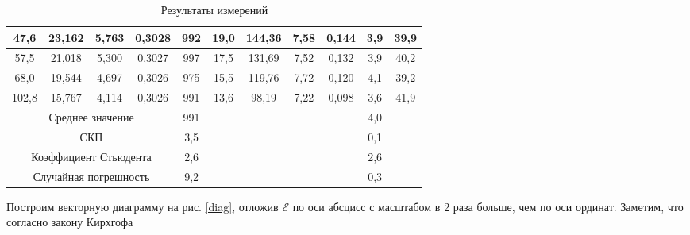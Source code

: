 \documentclass[a4paper, 12pt]{article}
\begin{document}
\begin{table}[H]
\begin{tabular}{|ccccccccccc|}
        \multicolumn{1}{|c|}{47,6} & \multicolumn{1}{c|}{23,162} & \multicolumn{1}{c|}{5,763} & \multicolumn{1}{c|}{0,3028} & \multicolumn{1}{c|}{992} & \multicolumn{1}{c|}{19,0} & \multicolumn{1}{c|}{144,36} & \multicolumn{1}{c|}{7,58} & \multicolumn{1}{c|}{0,144} & \multicolumn{1}{c|}{3,9} & 39,9 \\ \hline
        \multicolumn{1}{|c|}{57,5} & \multicolumn{1}{c|}{21,018} & \multicolumn{1}{c|}{5,300} & \multicolumn{1}{c|}{0,3027} & \multicolumn{1}{c|}{997} & \multicolumn{1}{c|}{17,5} & \multicolumn{1}{c|}{131,69} & \multicolumn{1}{c|}{7,52} & \multicolumn{1}{c|}{0,132} & \multicolumn{1}{c|}{3,9} & 40,2 \\ \hline
        \multicolumn{1}{|c|}{68,0} & \multicolumn{1}{c|}{19,544} & \multicolumn{1}{c|}{4,697} & \multicolumn{1}{c|}{0,3026} & \multicolumn{1}{c|}{975} & \multicolumn{1}{c|}{15,5} & \multicolumn{1}{c|}{119,76} & \multicolumn{1}{c|}{7,72} & \multicolumn{1}{c|}{0,120} & \multicolumn{1}{c|}{4,1} & 39,2 \\ \hline
        \multicolumn{1}{|c|}{102,8} & \multicolumn{1}{c|}{15,767} & \multicolumn{1}{c|}{4,114} & \multicolumn{1}{c|}{0,3026} & \multicolumn{1}{c|}{991} & \multicolumn{1}{c|}{13,6} & \multicolumn{1}{c|}{98,19} & \multicolumn{1}{c|}{7,22} & \multicolumn{1}{c|}{0,098} & \multicolumn{1}{c|}{3,6} & 41,9 \\ \hline
        \multicolumn{4}{|c|}{Среднее значение} & \multicolumn{1}{c|}{991} & \multicolumn{4}{c|}{\multirow{4}{*}{}} & \multicolumn{1}{c|}{4,0} & \multirow{4}{*}{} \\ \cline{1-5} \cline{10-10}
        \multicolumn{4}{|c|}{СКП} & \multicolumn{1}{c|}{3,5} & \multicolumn{4}{c|}{} & \multicolumn{1}{c|}{0,1} &  \\ \cline{1-5} \cline{10-10}
        \multicolumn{4}{|c|}{Коэффициент Стьюдента} & \multicolumn{1}{c|}{2,6} & \multicolumn{4}{c|}{} & \multicolumn{1}{c|}{2,6} &  \\ \cline{1-5} \cline{10-10}
        \multicolumn{4}{|c|}{Случайная погрешность} & \multicolumn{1}{c|}{9,2} & \multicolumn{4}{c|}{} & \multicolumn{1}{c|}{0,3} &  \\ \hline
        \end{tabular}
        \caption{Результаты измерений}
        \label{tab:res_1}
    \end{table}

    Построим векторную диаграмму на рис. \ref{diag}, отложив $\mathcal{E}$ по оси абсцисс с масштабом в 2 раза больше, чем по оси ординат. Заметим, что согласно закону Кирхгофа
    
\end{document}
